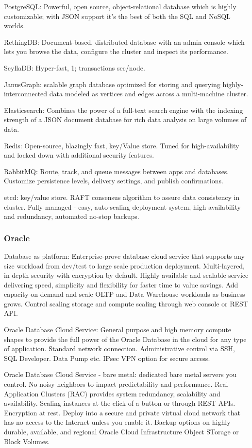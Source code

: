 PostgreSQL: Powerful, open source, object-relational database which is highly customizable; with JSON support it's the best of both the SQL and NoSQL worlds. 

RethingDB: Document-based, distributed database with an admin console which lets you browse the data, configure the cluster and inspect its performance. 

ScyllaDB: Hyper-fast, 1; transactions sec/node. 

JanusGraph: scalable graph database optimized for storing and querying highly-interconnected data modeled as vertices and edges across a multi-machine cluster. 

Elasticsearch: Combines the power of a full-text search engine with the indexing strength of a JSON document database for rich data analysis on large volumes of data. 

Redis: Open-source, blazingly fast, key/Value store. Tuned for high-availability and locked down with additional security features. 

RabbitMQ: Route, track, and queue messages between apps and databases. Customize persistence levels, delivery settings, and publish confirmations. 

etcd: key/value store. RAFT consensus algorithm to assure data consistency in cluster. Fully managed - easy, auto-scaling deployment system, high availability and redundancy, automated no-stop backups.  

\subsubsection{Oracle}
Database as platform: Enterprise-prove database cloud service that supports any size workload from dev/test to large scale production deployment. Multi-layered, in depth security with encryption by default. Highly available and scalable service delivering speed, simplicity and flexibility for faster time to value savings. Add capacity on-demand and scale OLTP and Data Warehouse workloads as business grows. Control scaling storage and compute scaling through web console or REST API. 

Oracle Database Cloud Service: General purpose and high memory compute shapes to provide the full power of the Oracle Database in the cloud for any type of application. Standard network connection. Administrative control via SSH, SQL Developer. Data Pump etc. IPsec VPN option for secure access. 

Oracle Database Cloud Service - bare metal: dedicated bare metal servers you control. No noisy neighbors to impact predictability and performance. Real Application Clusters (RAC) provides system redundancy, scalability and availability. Scaling instances at the click of a button or through REST APIs. Encryption at rest. Deploy into a secure and private virtual cloud network that has no access to the Internet unless you enable it. Backup options on highly durable, available, and regional Oracle Cloud Infrastructure Object STorage or Block Volumes. 


